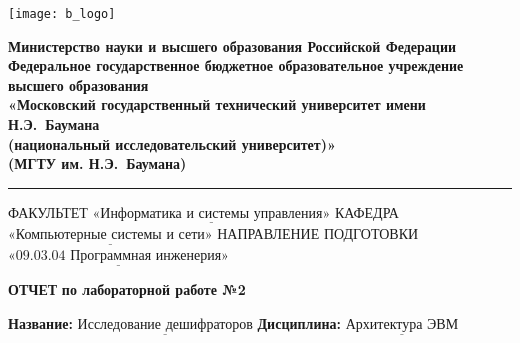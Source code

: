 \documentclass[a4paper,12pt]{article}
\begin{document}
\thispagestyle{empty}

\noindent \begin{minipage}{0.15\textwidth}
	\texttt{[image: b\_logo]}
\end{minipage}
\noindent\begin{minipage}{0.9\textwidth}\centering
	\textbf{Министерство науки и высшего образования Российской Федерации}\\
	\textbf{Федеральное государственное бюджетное образовательное учреждение высшего образования}\\
	\textbf{«Московский государственный технический университет имени Н.Э.~Баумана}\\
	\textbf{(национальный исследовательский университет)»}\\
	\textbf{(МГТУ им. Н.Э.~Баумана)}
\end{minipage}

\noindent\rule{18cm}{3pt}
\newline\newline
\noindent ФАКУЛЬТЕТ $\underline{\text{«Информатика и системы управления»}}$ \newline\newline
\noindent КАФЕДРА $\underline{\text{«Компьютерные системы и сети»}}$\newline\newline
\noindent НАПРАВЛЕНИЕ ПОДГОТОВКИ $\underline{\text{«09.03.04 Программная инженерия»}}$\newline\newline\newline\newline\newline


\begin{center}
	\noindent\begin{minipage}{1.3\textwidth}\centering
	\Large\textbf{  ОТЧЕТ }\newline
	\textbf{по лабораторной работе №2}\newline\newline
	\end{minipage}
\end{center}

\noindent\textbf{Название:} $\underline{\text{Исследование дешифраторов}}$\newline\newline
\noindent\textbf{Дисциплина:} $\underline{\text{Архитектура ЭВМ}}$\newline\newline\newline\newline\newline
\end{document}
